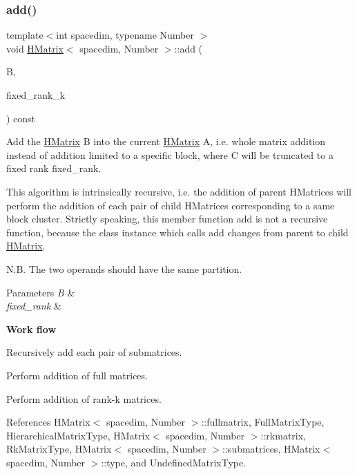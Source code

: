 \subsubsection{\texorpdfstring{add()}{add()}\hspace{0.1cm}{\footnotesize\ttfamily [2/2]}}
{\footnotesize\ttfamily template$<$int spacedim, typename Number $>$ \\
void \hyperlink{classHMatrix}{H\+Matrix}$<$ spacedim, Number $>$\+::add (\begin{DoxyParamCaption}\item[{const \hyperlink{classHMatrix}{H\+Matrix}$<$ spacedim, Number $>$ \&}]{B,  }\item[{const \hyperlink{classHMatrix_a5ca8dc549783d38371a01ecd621ecb34}{size\+\_\+type}}]{fixed\+\_\+rank\+\_\+k }\end{DoxyParamCaption}) const}

Add the \hyperlink{classHMatrix}{H\+Matrix} {\ttfamily B} into the current \hyperlink{classHMatrix}{H\+Matrix} {\ttfamily A}, i.\+e. whole matrix addition instead of addition limited to a specific block, where {\ttfamily C} will be truncated to a fixed rank {\ttfamily fixed\+\_\+rank}.

This algorithm is intrinsically recursive, i.\+e. the addition of parent H\+Matrices will perform the addition of each pair of child H\+Matrices corresponding to a same block cluster. Strictly speaking, this member function {\ttfamily add} is not a recursive function, because the class instance which calls {\ttfamily add} changes from parent to child \hyperlink{classHMatrix}{H\+Matrix}.

N.\+B. The two operands should have the same partition.


\begin{DoxyParams}{Parameters}
{\em B} & \\
\hline
{\em fixed\+\_\+rank} & \\
\hline
\end{DoxyParams}
{\bfseries Work flow}

Recursively add each pair of submatrices.

Perform addition of full matrices.

Perform addition of rank-\/k matrices.

References H\+Matrix$<$ spacedim, Number $>$\+::fullmatrix, Full\+Matrix\+Type, Hierarchical\+Matrix\+Type, H\+Matrix$<$ spacedim, Number $>$\+::rkmatrix, Rk\+Matrix\+Type, H\+Matrix$<$ spacedim, Number $>$\+::submatrices, H\+Matrix$<$ spacedim, Number $>$\+::type, and Undefined\+Matrix\+Type.

